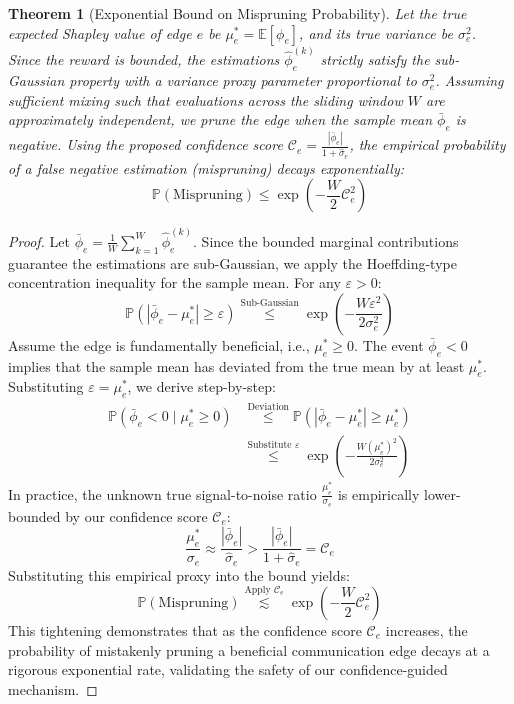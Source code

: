 \documentclass{article}
\newtheorem{theorem}{Theorem}
\begin{document}
\begin{theorem}[Exponential Bound on Mispruning Probability]
Let the true expected Shapley value of edge $e$ be $\mu_e^* = \mathbb{E}[\phi_e]$, and its true variance be $\sigma_e^2$. Since the reward is bounded, the estimations $\hat{\phi}_e^{(k)}$ strictly satisfy the sub-Gaussian property with a variance proxy parameter proportional to $\sigma_e^2$. Assuming sufficient mixing such that evaluations across the sliding window $W$ are approximately independent, we prune the edge when the sample mean $\bar{\phi}_e$ is negative. Using the proposed confidence score $\mathcal{C}_e = \frac{|\bar{\phi}_e|}{1 + \hat{\sigma}_e}$, the empirical probability of a false negative estimation (mispruning) decays \textit{exponentially}:
\begin{equation}
    \mathbb{P}(\text{Mispruning}) \le \exp\left(- \frac{W}{2} \mathcal{C}_e^2 \right)
\end{equation}
\end{theorem}

\begin{proof}
Let $\bar{\phi}_e = \frac{1}{W} \sum_{k=1}^W \hat{\phi}_{e}^{(k)}$. Since the bounded marginal contributions guarantee the estimations are sub-Gaussian, we apply the Hoeffding-type concentration inequality for the sample mean. For any $\varepsilon > 0$:
\begin{equation}
    \mathbb{P}(|\bar{\phi}_e - \mu_e^*| \ge \varepsilon) \overset{\text{Sub-Gaussian}}{\le} \exp\left(-\frac{W \varepsilon^2}{2\sigma_e^2}\right)
\end{equation}
Assume the edge is fundamentally beneficial, i.e., $\mu_e^* \ge 0$. The event $\bar{\phi}_e < 0$ implies that the sample mean has deviated from the true mean by at least $\mu_e^*$. Substituting $\varepsilon = \mu_e^*$, we derive step-by-step:
\begin{align}
    \mathbb{P}(\bar{\phi}_e < 0 \mid \mu_e^* \ge 0) &\overset{\text{Deviation}}{\le} \mathbb{P}(|\bar{\phi}_e - \mu_e^*| \ge \mu_e^*) \\
    &\overset{\text{Substitute } \varepsilon}{\le} \exp\left(-\frac{W (\mu_e^*)^2}{2\sigma_e^2}\right)
\end{align}
In practice, the unknown true signal-to-noise ratio $\frac{\mu_e^*}{\sigma_e}$ is empirically lower-bounded by our confidence score $\mathcal{C}_e$:
\begin{equation}
    \frac{\mu_e^*}{\sigma_e} \approx \frac{|\bar{\phi}_e|}{\hat{\sigma}_e} > \frac{|\bar{\phi}_e|}{1 + \hat{\sigma}_e} = \mathcal{C}_e
\end{equation}
Substituting this empirical proxy into the bound yields:
\begin{equation}
    \mathbb{P}(\text{Mispruning}) \overset{\text{Apply } \mathcal{C}_e}{\lesssim} \exp\left(- \frac{W}{2} \mathcal{C}_e^2 \right)
\end{equation}
This tightening demonstrates that as the confidence score $\mathcal{C}_e$ increases, the probability of mistakenly pruning a beneficial communication edge decays at a rigorous exponential rate, validating the safety of our confidence-guided mechanism.
\end{proof}
\end{document}
